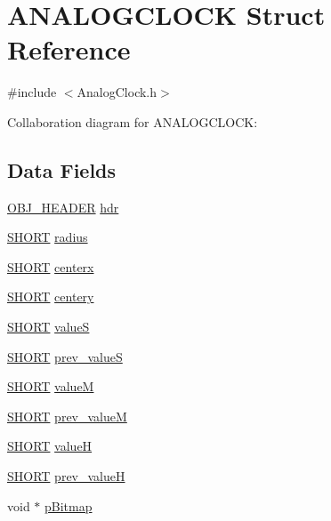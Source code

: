 \hypertarget{struct_a_n_a_l_o_g_c_l_o_c_k}{}\section{A\+N\+A\+L\+O\+G\+C\+L\+O\+C\+K Struct Reference}
\label{struct_a_n_a_l_o_g_c_l_o_c_k}


{\ttfamily \#include $<$Analog\+Clock.\+h$>$}



Collaboration diagram for A\+N\+A\+L\+O\+G\+C\+L\+O\+C\+K\+:
\subsection*{Data Fields}
\begin{DoxyCompactItemize}
\item 
\hyperlink{struct_o_b_j___h_e_a_d_e_r}{O\+B\+J\+\_\+\+H\+E\+A\+D\+E\+R} \hyperlink{struct_a_n_a_l_o_g_c_l_o_c_k_abeffaf353197a8a64fba6707b68ce0be}{hdr}
\item 
\hyperlink{_generic_type_defs_8h_ae9bb25d3afecf3bfab0fbe3c22c2050f}{S\+H\+O\+R\+T} \hyperlink{struct_a_n_a_l_o_g_c_l_o_c_k_ae5bf5300978dec1b6c69ee537e1c98f8}{radius}
\item 
\hyperlink{_generic_type_defs_8h_ae9bb25d3afecf3bfab0fbe3c22c2050f}{S\+H\+O\+R\+T} \hyperlink{struct_a_n_a_l_o_g_c_l_o_c_k_a8cbdf3f0f53a2e47e828ed9f505ce91e}{centerx}
\item 
\hyperlink{_generic_type_defs_8h_ae9bb25d3afecf3bfab0fbe3c22c2050f}{S\+H\+O\+R\+T} \hyperlink{struct_a_n_a_l_o_g_c_l_o_c_k_a3ebcb7099606a53c6ebb35c64c9cac8b}{centery}
\item 
\hyperlink{_generic_type_defs_8h_ae9bb25d3afecf3bfab0fbe3c22c2050f}{S\+H\+O\+R\+T} \hyperlink{struct_a_n_a_l_o_g_c_l_o_c_k_aa7e69d69c7ae58d5d0e5f0c570fde177}{value\+S}
\item 
\hyperlink{_generic_type_defs_8h_ae9bb25d3afecf3bfab0fbe3c22c2050f}{S\+H\+O\+R\+T} \hyperlink{struct_a_n_a_l_o_g_c_l_o_c_k_a9a263ee0b5260f4a76b1933bcdd83dde}{prev\+\_\+value\+S}
\item 
\hyperlink{_generic_type_defs_8h_ae9bb25d3afecf3bfab0fbe3c22c2050f}{S\+H\+O\+R\+T} \hyperlink{struct_a_n_a_l_o_g_c_l_o_c_k_aac3f32c2bc541f64ed3eeefbb987c363}{value\+M}
\item 
\hyperlink{_generic_type_defs_8h_ae9bb25d3afecf3bfab0fbe3c22c2050f}{S\+H\+O\+R\+T} \hyperlink{struct_a_n_a_l_o_g_c_l_o_c_k_ab560e959827e3d4e2e098a8f3b86a99d}{prev\+\_\+value\+M}
\item 
\hyperlink{_generic_type_defs_8h_ae9bb25d3afecf3bfab0fbe3c22c2050f}{S\+H\+O\+R\+T} \hyperlink{struct_a_n_a_l_o_g_c_l_o_c_k_a643069815f1587ae65a480bff07f1fad}{value\+H}
\item 
\hyperlink{_generic_type_defs_8h_ae9bb25d3afecf3bfab0fbe3c22c2050f}{S\+H\+O\+R\+T} \hyperlink{struct_a_n_a_l_o_g_c_l_o_c_k_aa950313112066bab5e42d3468946951a}{prev\+\_\+value\+H}
\item 
void $\ast$ \hyperlink{struct_a_n_a_l_o_g_c_l_o_c_k_aef9bed8e1a29e17226ccbd9a3d81f9e1}{p\+Bitmap}
\end{DoxyCompactItemize}



